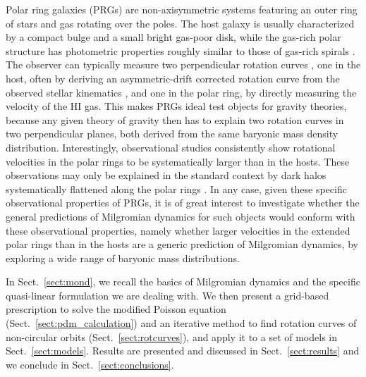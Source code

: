 \documentclass[useAMS,usenatbib]{mn2e}
\begin{document}
Polar ring galaxies (PRGs) are non-axisymmetric systems featuring an outer ring of stars and gas rotating over the poles. The host galaxy is usually characterized by a compact bulge and a small bright gas-poor disk, while the gas-rich polar structure has photometric properties roughly similar to those of gas-rich spirals \citep[e.g.,][]{Whitmore1990}. 
The observer can typically measure two perpendicular rotation curves
\citep{Schweizer1983,Sackett1990,Sackett1994,Reshetnikov1994,CombesArnaboldi,Iodice03,Iodice2006,Iodice2}, 
one in the host, often by deriving an asymmetric-drift corrected rotation curve from the observed stellar kinematics \citep[see, e.g.,][]{CombesArnaboldi}, and one in the polar ring, by directly measuring the velocity of the HI gas. This makes PRGs ideal test objects for gravity theories, because any given theory of gravity then has to explain two rotation curves in two perpendicular planes, both derived from the same baryonic mass density distribution. Interestingly, observational studies \citep{Iodice03, Moiseev11} consistently show rotational velocities in the polar rings to be systematically larger than in the hosts. 
These observations may only be explained in the standard context by dark halos systematically flattened along the polar rings \citep[see][]{Iodice03}. In any case, given these specific observational properties of PRGs, it is of great interest to investigate whether the general predictions of Milgromian dynamics for such objects would conform with these observational properties, 
namely whether larger velocities in the extended polar rings than in the hosts are a generic prediction of Milgromian dynamics, by exploring a wide range of baryonic mass distributions.

In Sect.~\ref{sect:mond}, we recall the basics of Milgromian dynamics and the specific quasi-linear formulation we are dealing with. We then present a grid-based prescription to solve the modified Poisson equation (Sect.~\ref{sect:pdm_calculation}) and an iterative method to find rotation curves of non-circular orbits (Sect.~\ref{sect:rotcurves}), and apply it to a set of models in Sect.~\ref{sect:models}. Results are presented and discussed in Sect.~\ref{sect:results} and we conclude in Sect.~\ref{sect:conclusions}.
\end{document}

